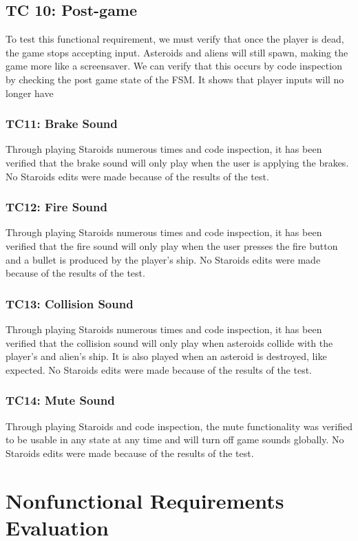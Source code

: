 \documentclass[12pt, titlepage]{article}
\begin{document}
\subsection{TC 10: Post-game}
To test this functional requirement, we must verify that once the player is dead, the game stops accepting input. Asteroids and aliens will still spawn, making the game more like a screensaver. We can verify that this occurs by code inspection by checking the post game state of the FSM. It shows that player inputs will no longer have
\subsubsection{TC11: Brake Sound}
Through playing Staroids numerous times and code inspection, it has been verified that the brake sound will only play when the user is applying the brakes. No Staroids edits were made because of the results of the test.
\subsubsection{TC12: Fire Sound}
Through playing Staroids numerous times and code inspection, it has been verified that the fire sound will only play when the user presses the fire button and a bullet is produced by the player's ship. No Staroids edits were made because of the results of the test.
\subsubsection{TC13: Collision Sound}
Through playing Staroids numerous times and code inspection, it has been verified that the collision sound will only play when asteroids collide with the player's and alien's ship. It is also played when an asteroid is destroyed, like expected. No Staroids edits were made because of the results of the test.
\subsubsection{TC14: Mute Sound}
Through playing Staroids and code inspection, the mute functionality was verified to be usable in any state at any time and will turn off game sounds globally. No Staroids edits were made because of the results of the test.

\section{Nonfunctional Requirements Evaluation}
\end{document}
